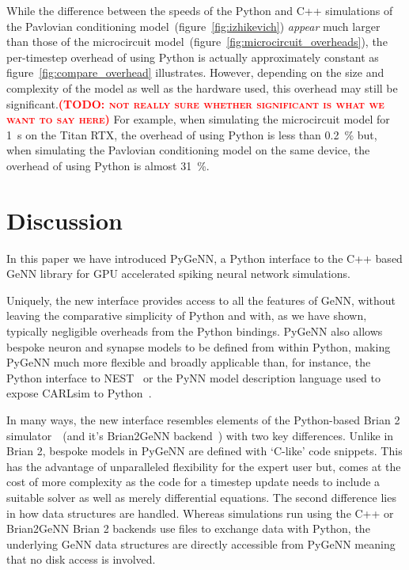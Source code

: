 \documentclass[utf8]{frontiersSCNS} %
\newcommand{\todo}[1]{\textbf{\textsc{\textcolor{red}{(TODO: #1)}}}}
\begin{document}
While the difference between the speeds of the Python and C++ simulations of the Pavlovian conditioning model~(figure~\ref{fig:izhikevich}) \emph{appear} much larger than those of the microcircuit model~(figure~\ref{fig:microcircuit_overheads}), the per-timestep overhead of using Python is actually approximately constant as figure~\ref{fig:compare_overhead} illustrates.
However, depending on the size and complexity of the model as well as the hardware used, this overhead may still be significant.\todo{not really sure whether significant is what we want to say here}
For example, when simulating the microcircuit model for \SI{1}{\second} on the Titan RTX, the overhead of using Python is less than \SI{0.2}{\percent} but, when simulating the Pavlovian conditioning model on the same device, the overhead of using Python is almost \SI{31}{\percent}.

\section{Discussion}
In this paper we have introduced PyGeNN, a Python interface to the C++ based GeNN library for GPU accelerated spiking neural network simulations.

Uniquely, the new interface provides access to all the features of GeNN, without leaving the comparative simplicity of Python and with, as we have shown, typically negligible overheads from the Python bindings.
PyGeNN also allows bespoke neuron and synapse models to be defined from within Python, making PyGeNN much more flexible and broadly applicable than, for instance, the Python interface to NEST~\citep{Eppler2009} or the PyNN model description language used to expose CARLsim to Python~\citep{Balaji2020}.

In many ways, the new interface resembles elements of the Python-based Brian 2 simulator~\citep{Stimberg2019}~(and it's Brian2GeNN backend~\citep{Stimberg2020}) with two key differences.
Unlike in Brian 2, bespoke models in PyGeNN are defined with `C-like' code snippets. 
This has the advantage of unparalleled flexibility for the expert user but, comes at the cost of more complexity as the code for a timestep update needs to include a suitable solver as well as merely differential equations.
The second difference lies in how data structures are handled. 
Whereas simulations run using the C++ or Brian2GeNN Brian 2 backends use files to exchange data with Python, the underlying GeNN data structures are directly accessible from PyGeNN meaning that no disk access is involved.
\end{document}
